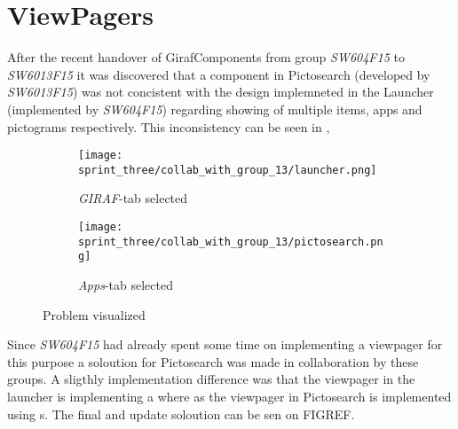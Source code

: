 
\section{ViewPagers} %
\label{sec:viewpagers}


After the recent handover of GirafComponents from group \emph{SW604F15} to \emph{SW6013F15} it was discovered that a component in Pictosearch (developed by \emph{SW6013F15}) was not concistent with the design implemneted in the Launcher (implemented by \emph{SW604F15}) regarding showing of multiple items, apps and pictograms respectively. This inconsistency can be seen in , 

\begin{figure}[!htbp]
    \centering

    \begin{subfigure}[t]{0.4\textwidth}
        \texttt{[image: sprint\_three/collab\_with\_group\_13/launcher.png]}
        \caption{\emph{GIRAF}-tab selected}
        \label{fig:collab_with_group_13_launhcer}
    \end{subfigure}
    \hspace{5em} 
    \begin{subfigure}[t]{0.4\textwidth}
        \texttt{[image: sprint\_three/collab\_with\_group\_13/pictosearch.png]}
        \caption{\emph{Apps}-tab selected}
        \label{fig:collab_with_group_13_pictosearch}
    \end{subfigure}
    
    \caption{Problem visualized}
    \label{fig:collab_with_group_13}
\end{figure}

Since \emph{SW604F15} had already spent some time on implementing a viewpager for this purpose a soloution for Pictosearch was made in collaboration by these groups. A sligthly implementation difference was that the viewpager in the launcher is implementing a  where as the viewpager in Pictosearch is implemented using s. The final and update soloution can be sen on FIGREF.

